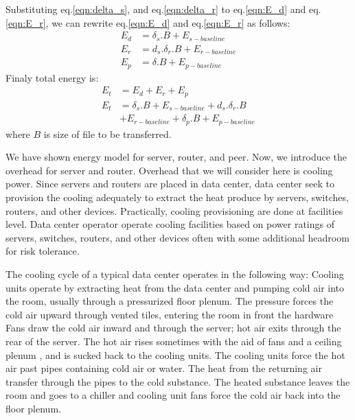 \documentclass[conference]{IEEEtran}
\begin{document}
Substituting eq.\ref{eqn:delta_s}, and eq.\ref{eqn:delta_r} to eq.\ref{eqn:E_d} and eq.\ref{eqn:E_r}, we can rewrite eq.\ref{eqn:E_d} and eq.\ref{eqn:E_r} as follows:
\begin{equation}\label{eqn:E_d dan E_r}
\begin{split}
	E_{d} &= \delta_s.B + E_{s-baseline}\\
	E_{r} &= d_s.\delta_r.B + E_{r-baseline}\\
	E_{p} &= \delta.B + E_{p-baseline}
\end{split}
\end{equation}
Finaly total energy is:
\begin{equation}\label{eqn:E_t}
\begin{split}
	E_{t} &= E_d + E_r + E_p \\
	E_{t} &= \delta_s.B + E_{s-baseline} + d_s.\delta_r.B \\
	      &+ E_{r-baseline} + \delta_p.B + E_{p-baseline}
\end{split}
\end{equation}
where $B$ is size of file to be transferred. 

We have shown energy model for server, router, and peer.  
Now, we introduce the overhead for server and router. 
Overhead that we will consider here is cooling power.  
Since servers and routers are placed in data center, data center seek to provision the cooling adequately to extract the heat produce by servers, switches, routers, and other devices.
Practically, cooling provisioning are done at facilities level.
Data center operator operate cooling facilities based on power ratings of servers, switches, routers, and other devices often with some additional headroom for risk tolerance. 

The cooling cycle of a typical data center operates in the following way:
Cooling units operate by extracting heat from the data center and pumping cold air into the room, usually through a pressurized floor plenum.
The pressure forces the cold air upward through vented tiles, entering the room in front the hardware
Fans draw the cold air inward and through the server; hot air exits through the rear of the server.
The hot air rises sometimes with the aid of fans and a ceiling plenum , and is sucked back to the cooling units.
The cooling units force the hot air past pipes containing cold air or water. 
The heat from the returning air transfer through the pipes to the cold substance. 
The heated substance leaves the room and goes to a chiller and cooling unit fans force the cold air back into the floor plenum. 
\end{document}

